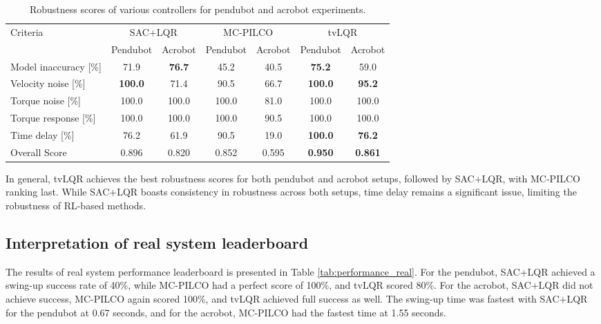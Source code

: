 \begin{table}[H]
  \centering
 \begin{tabular}{lcccccc}
 \hline
 Criteria & \multicolumn{2}{c}{SAC+LQR} & \multicolumn{2}{c}{MC-PILCO} & \multicolumn{2}{c}{tvLQR} \\
 & Pendubot & Acrobot & Pendubot & Acrobot & Pendubot & Acrobot \\
 \hline
 Model inaccuracy [\%] & 71.9 & \textbf{76.7} & 45.2 & 40.5 & \textbf{75.2} & 59.0 \\
 Velocity noise [\%] & \textbf{100.0} & 71.4 & 90.5 & 66.7 & \textbf{100.0} & \textbf{95.2} \\
 Torque noise [\%] & 100.0 & 100.0 & 100.0 & 81.0 & 100.0 & 100.0 \\
 Torque response [\%] & 100.0 & 100.0 & 100.0 & 90.5 & 100.0 & 100.0 \\
 Time delay [\%] & 76.2 & 61.9 & 90.5 & 19.0 & \textbf{100.0} & \textbf{76.2} \\
 Overall Score & 0.896 & 0.820 & 0.852 & 0.595 & \textbf{0.950} & \textbf{0.861} \\
 \hline
 \end{tabular}
 \caption{Robustness scores of various controllers for pendubot and acrobot experiments.}
 \label{tab:robustness}
\end{table}

In general, tvLQR achieves the best robustness scores for both pendubot and acrobot setups, followed by SAC+LQR, with MC-PILCO ranking last. While SAC+LQR boasts consistency in robustness across both setups, time delay remains a significant issue, limiting the robustness of RL-based methods.

\subsection{Interpretation of real system leaderboard}
The results of real system performance leaderboard is presented in Table \ref{tab:performance_real}. For the pendubot, SAC+LQR achieved a swing-up success rate of 40\%, while MC-PILCO had a perfect score of 100\%, and tvLQR scored 80\%. For the acrobot, SAC+LQR did not achieve success, MC-PILCO again scored 100\%, and tvLQR achieved full success as well. The swing-up time was fastest with SAC+LQR for the pendubot at 0.67 seconds, and for the acrobot, MC-PILCO had the fastest time at 1.55 seconds.

